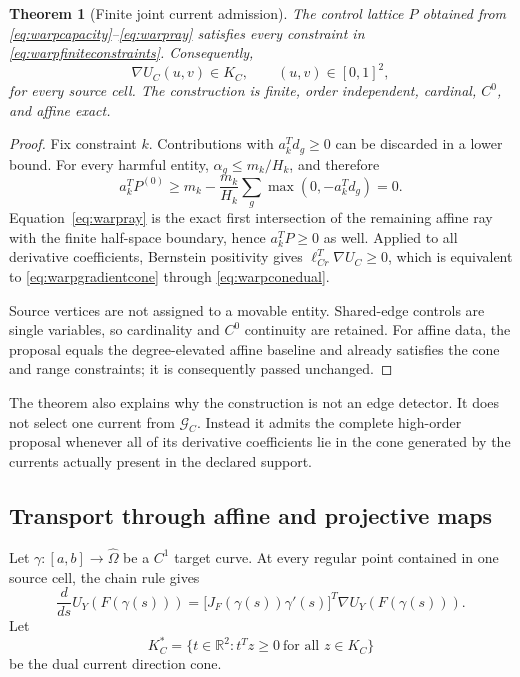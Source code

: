 \documentclass[journal]{IEEEtran}
\newtheorem{theorem}{Theorem}
\newcommand{\R}{\mathbb{R}}
\begin{document}
\begin{theorem}[Finite joint current admission]
The control lattice \(P\) obtained from
\eqref{eq:warpcapacity}--\eqref{eq:warpray} satisfies every constraint in
\eqref{eq:warpfiniteconstraints}.  Consequently,
\begin{equation}
 \nabla U_C(u,v)\in K_C,
 \qquad (u,v)\in[0,1]^2,
 \label{eq:warpgradientcone}
\end{equation}
for every source cell.  The construction is finite, order independent,
cardinal, \(C^0\), and affine exact.
\end{theorem}

\begin{proof}
Fix constraint \(k\).  Contributions with \(a_k^Td_g\geq0\) can be
discarded in a lower bound.  For every harmful entity,
\(\alpha_g\leq m_k/H_k\), and therefore
\begin{equation}
 a_k^TP^{(0)}
 \geq m_k-\frac{m_k}{H_k}
       \sum_g\max(0,-a_k^Td_g)
 =0.
 \label{eq:warpcapacityproof}
\end{equation}
Equation~\eqref{eq:warpray} is the exact first intersection of the remaining
affine ray with the finite half-space boundary, hence \(a_k^TP\geq0\) as
well.  Applied to all derivative coefficients, Bernstein positivity gives
\(\ell_{Cr}^T\nabla U_C\geq0\), which is equivalent to
\eqref{eq:warpgradientcone} through \eqref{eq:warpconedual}.

Source vertices are not assigned to a movable entity.  Shared-edge controls
are single variables, so cardinality and \(C^0\) continuity are retained.
For affine data, the proposal equals the degree-elevated affine baseline and
already satisfies the cone and range constraints; it is consequently passed
unchanged.
\end{proof}

The theorem also explains why the construction is not an edge detector.  It
does not select one current from \(\mathcal G_C\).  Instead it admits the
complete high-order proposal whenever all of its derivative coefficients lie
in the cone generated by the currents actually present in the declared
support.

\subsection{Transport through affine and projective maps}

Let \(\gamma:[a,b]\to\widehat\Omega\) be a \(C^1\) target curve.  At every
regular point contained in one source cell, the chain rule gives
\begin{equation}
 \frac{d}{ds}U_Y(F(\gamma(s)))=
 \bigl[J_F(\gamma(s))\gamma'(s)\bigr]^T
 \nabla U_Y(F(\gamma(s))).
 \label{eq:warpchain}
\end{equation}
Let
\begin{equation}
 K_C^*=\{t\in\R^2:t^Tz\geq0\ \text{for all }z\in K_C\}
 \label{eq:warpdual}
\end{equation}
be the dual current direction cone.
\end{document}
